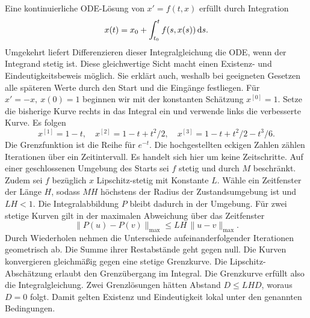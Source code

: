 Eine kontinuierliche ODE-Lösung von \(x'=f(t,x)\) erfüllt durch Integration
\[
 x(t)=x_0+\int_{t_0}^t f(s,x(s))\,\mathrm{d} s .
\]
Umgekehrt liefert Differenzieren dieser Integralgleichung die ODE, wenn der Integrand stetig ist. Diese gleichwertige Sicht macht einen Existenz- und Eindeutigkeitsbeweis möglich. Sie erklärt auch, weshalb bei geeigneten Gesetzen alle späteren Werte durch den Start und die Eingänge festliegen.
Für \(x'=-x,\ x(0)=1\) beginnen wir mit der konstanten Schätzung \(x^{[0]}=1\). Setze die bisherige Kurve rechts in das Integral ein und verwende links die verbesserte Kurve. Es folgen
\[
 x^{[1]}=1-t,\quad x^{[2]}=1-t+t^2/2,\quad
 x^{[3]}=1-t+t^2/2-t^3/6 .
\]
Die Grenzfunktion ist die Reihe für \(e^{-t}\). Die hochgestellten eckigen Zahlen zählen Iterationen über ein Zeitintervall. Es handelt sich hier um keine Zeitschritte.
Auf einer geschlossenen Umgebung des Starts sei \(f\) stetig und durch \(M\) beschränkt. Zudem sei \(f\) bezüglich \(x\) Lipschitz-stetig mit Konstante \(L\). Wähle ein Zeitfenster der Länge \(H\), sodass \(MH\) höchstens der Radius der Zustandsumgebung ist und \(LH<1\). Die Integralabbildung \(P\) bleibt dadurch in der Umgebung. Für zwei stetige Kurven gilt in der maximalen Abweichung über das Zeitfenster
\[
 \|P(u)-P(v)\|_{\max}\le LH\,\|u-v\|_{\max}.
\]
Durch Wiederholen nehmen die Unterschiede aufeinanderfolgender Iterationen geometrisch ab. Die Summe ihrer Restabstände geht gegen null. Die Kurven konvergieren gleichmäßig gegen eine stetige Grenzkurve. Die Lipschitz-Abschätzung erlaubt den Grenzübergang im Integral. Die Grenzkurve erfüllt also die Integralgleichung. Zwei Grenzlösungen hätten Abstand \(D\le LH D\), woraus \(D=0\) folgt. Damit gelten Existenz und Eindeutigkeit lokal unter den genannten Bedingungen.

